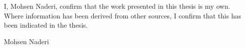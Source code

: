 %


\begin{declaration}

\vskip 2cm
I, Mohsen Naderi, confirm that the work presented in this thesis is my own.
Where information has been derived from other sources, I confirm that this has been indicated in the thesis.

\vskip 2cm

\noindent Mohsen Naderi


\end{declaration}
